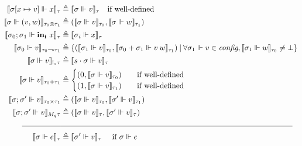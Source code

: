 \begin{definition}
\begin{equation}
\begin{aligned}[c]
  \llbracket \sigma [x \mapsto v] \Vdash x \rrbracket_{\tau} &\triangleq
    \llbracket \sigma \Vdash v \rrbracket_{\tau} \quad \text{if well-defined} \\
  \llbracket \sigma \Vdash (v, w) \rrbracket_{\tau_0 \otimes \tau_1} &\triangleq
    (\llbracket \sigma \Vdash v \rrbracket_{\tau_0}, \llbracket \sigma \Vdash w
    \rrbracket_{\tau_1}) \\
  \llbracket \sigma_0; \sigma_1 \Vdash \mathbf{in_i} \ x \rrbracket_{\tau}
    &\triangleq \llbracket \sigma_i \Vdash x \rrbracket_{\tau} \\
  \llbracket \sigma_0 \Vdash v \rrbracket_{\tau_0 \multimap \tau_1}
    &\triangleq \{ (\llbracket \sigma_1 \Vdash v \rrbracket_{\tau_0}, \llbracket
    \sigma_0 + \sigma_1 \Vdash v \> w \rrbracket_{\tau_1}) \> | \>
    \forall \sigma_1 \Vdash v \in \textit{config}, \llbracket \sigma_1 \Vdash w
    \rrbracket_{\tau_0} \not= \bot \} \\
  \llbracket \sigma \Vdash v \rrbracket_{!_s \tau} &\triangleq \llbracket s
    \cdot \sigma
    \Vdash v \rrbracket_\tau \\
  \llbracket \sigma \Vdash v \rrbracket_{\tau_0 + \tau_1} &\triangleq
    \begin{cases}
      (0, \llbracket \sigma \Vdash v \rrbracket_{\tau_0}) \quad &\text{if well-defined} \\
      (1, \llbracket \sigma \Vdash v \rrbracket_{\tau_1}) \quad &\text{if well-defined}
    \end{cases} \\
  \llbracket \sigma; \sigma' \Vdash v \rrbracket_{\tau_0 \times \tau_1}
    &\triangleq (\llbracket \sigma \Vdash v \rrbracket_{\tau_0}, \llbracket
    \sigma' \Vdash v \rrbracket_{\tau_1}) \\
  \llbracket \sigma; \sigma' \Vdash v \rrbracket_{M_q \tau} &\triangleq
    (\llbracket \sigma \Vdash v \rrbracket_{\tau}, \llbracket \sigma' \Vdash v
    \rrbracket_{\tau}) \\
  \rule{5em}{0.4pt}&\rule{30em}{0.4pt}\\
  \llbracket \sigma \Vdash e \rrbracket_{\tau} &\triangleq \llbracket \sigma'
    \Vdash v\rrbracket_{\tau} \quad{\text{ if } \sigma \Vdash e
}
\end{aligned}
\end{equation}
\end{definition}
